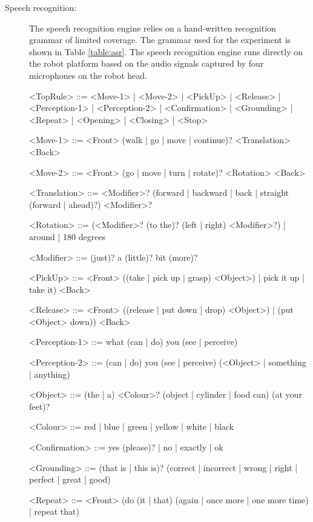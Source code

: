 \begin{description}
\item[Speech recognition: ] The speech recognition engine relies on a hand-written recognition grammar of limited coverage. The grammar used for the experiment is shown in Table \ref{table:asr}.  The speech recognition engine runs directly on the robot platform based on the audio signals captured by four microphones on the robot head.

\setlength{\grammarindent}{9em} 

\begin{table}[p!]
\vspace{2cm}
\begin{grammar}

<TopRule> ::= <Move-1> | <Move-2> | <PickUp> | <Release> | <Perception-1> | <Perception-2> | <Confirmation> | <Grounding> | <Repeat> | <Opening> | <Closing> | <Stop> 

<Move-1> ::= <Front> (walk | go | move | continue)? <Translation> <Back>

<Move-2> ::= <Front> (go | move | turn | rotate)? <Rotation> <Back>

<Translation> ::= <Modifier>? (forward | backward | back | straight (forward | ahead)?) <Modifier>?

<Rotation> ::= (<Modifier>? (to the)? (left | right) <Modifier>?) | around | 180 degrees

<Modifier> ::= (just)? a (little)? bit (more)? 

<PickUp> ::= <Front> ((take | pick up | grasp) <Object>) | pick it up | take it) <Back>

<Release> ::= <Front> ((release | put down | drop) <Object>) | (put <Object> down)) <Back> 

<Perception-1> ::= what (can | do) you (see | perceive)

<Perception-2> ::= (can | do) you (see | perceive) (<Object> | something | anything)

<Object> ::= (the | a) <Colour>? (object | cylinder | food can) (at your feet)? 

<Colour> ::= red | blue | green | yellow | white | black 

<Confirmation> ::= yes (please)? | no | exactly | ok 

<Grounding> ::= (that is | this is)? (correct  | incorrect | wrong | right | perfect | great | good) 

<Repeat> ::= <Front> (do (it | that) (again | once more | one more time) | repeat that)


\end{grammar}
\end{table}
\end{description}
